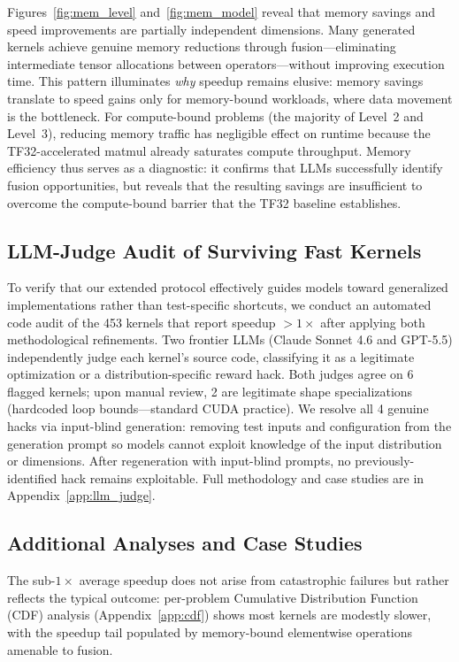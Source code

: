\documentclass[]{fairmeta}
\begin{document}
Figures~\ref{fig:mem_level} and~\ref{fig:mem_model} reveal that memory savings and speed improvements are partially independent dimensions. Many generated kernels achieve genuine memory reductions through fusion---eliminating intermediate tensor allocations between operators---without improving execution time. This pattern illuminates \emph{why} speedup remains elusive: memory savings translate to speed gains only for memory-bound workloads, where data movement is the bottleneck. For compute-bound problems (the majority of Level~2 and Level~3), reducing memory traffic has negligible effect on runtime because the TF32-accelerated matmul already saturates compute throughput. Memory efficiency thus serves as a diagnostic: it confirms that LLMs successfully identify fusion opportunities, but reveals that the resulting savings are insufficient to overcome the compute-bound barrier that the TF32 baseline establishes.




\subsection{LLM-Judge Audit of Surviving Fast Kernels}

To verify that our extended protocol effectively guides models toward generalized implementations rather than test-specific shortcuts, we conduct an automated code audit of the 453 kernels that report speedup $> 1\times$ after applying both methodological refinements. Two frontier LLMs (Claude Sonnet 4.6 and GPT-5.5) independently judge each kernel's source code, classifying it as a legitimate optimization or a distribution-specific reward hack. Both judges agree on 6 flagged kernels; upon manual review, 2 are legitimate shape specializations (hardcoded loop bounds---standard CUDA practice). We resolve all 4 genuine hacks via input-blind generation: removing test inputs and configuration from the generation prompt so models cannot exploit knowledge of the input distribution or dimensions. After regeneration with input-blind prompts, no previously-identified hack remains exploitable. Full methodology and case studies are in Appendix~\ref{app:llm_judge}.

\subsection{Additional Analyses and Case Studies}

The sub-$1\times$ average speedup does not arise from catastrophic failures but rather reflects the typical outcome: per-problem Cumulative Distribution Function (CDF) analysis (Appendix~\ref{app:cdf}) shows most kernels are modestly slower, with the speedup tail populated by memory-bound elementwise operations amenable to fusion.
\end{document}
